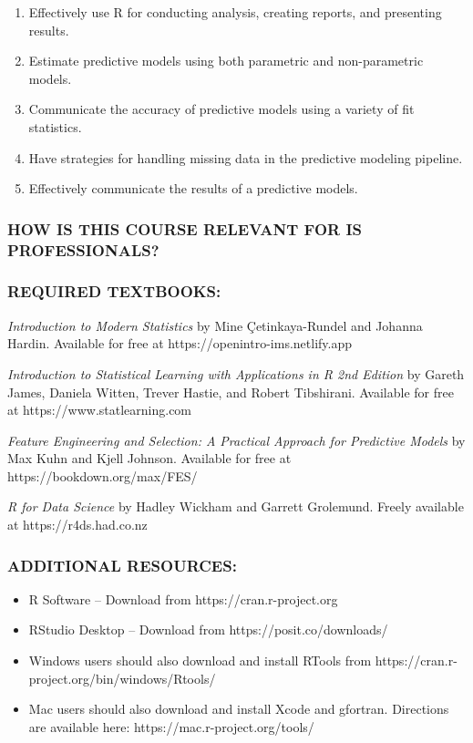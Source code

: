 \documentclass[
  letterpaper,
  DIV=11,
  numbers=noendperiod]{scrartcl}
\providecommand{\tightlist}{%
  \setlength{\itemsep}{0pt}\setlength{\parskip}{0pt}}\usepackage{longtable,booktabs,array}
\begin{document}
\begin{enumerate}
\def\labelenumi{\arabic{enumi}.}
\tightlist
\item
  Effectively use R for conducting analysis, creating reports, and
  presenting results.
\item
  Estimate predictive models using both parametric and non-parametric
  models.
\item
  Communicate the accuracy of predictive models using a variety of fit
  statistics.
\item
  Have strategies for handling missing data in the predictive modeling
  pipeline.
\item
  Effectively communicate the results of a predictive models.
\end{enumerate}

\subsubsection{HOW IS THIS COURSE RELEVANT FOR IS
PROFESSIONALS?}\label{how-is-this-course-relevant-for-is-professionals}

\subsubsection{REQUIRED TEXTBOOKS:}\label{required-textbooks}

\emph{Introduction to Modern Statistics} by Mine Çetinkaya-Rundel and
Johanna Hardin. Available for free at https://openintro-ims.netlify.app

\emph{Introduction to Statistical Learning with Applications in R 2nd
Edition} by Gareth James, Daniela Witten, Trever Hastie, and Robert
Tibshirani. Available for free at https://www.statlearning.com

\emph{Feature Engineering and Selection: A Practical Approach for
Predictive Models} by Max Kuhn and Kjell Johnson. Available for free at
https://bookdown.org/max/FES/

\emph{R for Data Science} by Hadley Wickham and Garrett Grolemund.
Freely available at https://r4ds.had.co.nz

\subsubsection{ADDITIONAL RESOURCES:}\label{additional-resources}

\begin{itemize}
\tightlist
\item
  R Software -- Download from https://cran.r-project.org
\item
  RStudio Desktop -- Download from https://posit.co/downloads/
\item
  Windows users should also download and install RTools from
  https://cran.r-project.org/bin/windows/Rtools/
\item
  Mac users should also download and install Xcode and gfortran.
  Directions are available here: https://mac.r-project.org/tools/
\end{itemize}
\end{document}
